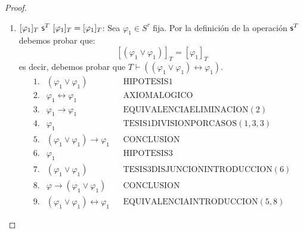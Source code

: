 \begin{proof}
\begin{enumerate}[(1)]
      \item $[\varphi_{1}]_{T} \ \SU^{T} \ [\varphi_{1}]_{T} = [\varphi_{1}]_{T}$: Sea $\varphi_{1} \in S^{\tau}$ fija.
        Por la definición de la operación $\mathsf{s}^{T}$ debemos probar que:
        \[
          [(\varphi_{1} \vee \varphi_{1})]_{T} = [\varphi_{1}]_{T}
        \]
        \PN es decir, debemos probar que $T \vdash ((\varphi_{1} \vee \varphi_{1}) \leftrightarrow \varphi_{1})$.
        \[
          \begin{array}{llll}
            1. & (\varphi_{1} \vee \varphi_{1}) && \text{HIPOTESIS1} \\
            2. & \varphi_{1} \leftrightarrow \varphi_{1} && \text{AXIOMALOGICO} \\
            3. & \varphi_{1} \rightarrow \varphi_{1} && \text{EQUIVALENCIAELIMINACION}(2) \\
            4. & \varphi_{1} && \text{TESIS1DIVISIONPORCASOS}(1,3,3) \\
            5. & (\varphi_{1} \vee \varphi_{1}) \rightarrow \varphi_{1} && \text{CONCLUSION} \\
            6. & \varphi_{1} && \text{HIPOTESIS3} \\
            7. & (\varphi_{1} \vee \varphi_{1}) && \text{TESIS3DISJUNCIONINTRODUCCION}(6) \\
            8. & \varphi \rightarrow (\varphi_{1} \vee \varphi_{1}) && \text{CONCLUSION} \\
            9. & (\varphi_{1} \vee \varphi_{1}) \leftrightarrow \varphi_{1} && \text{EQUIVALENCIAINTRODUCCION}(5,8)
          \end{array}
        \]


\end{enumerate}
\end{proof}
